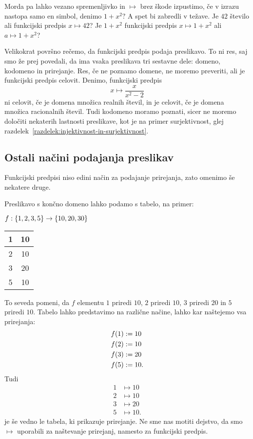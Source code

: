 Morda pa lahko vezano spremenljivko in $\mapsto$ brez škode izpustimo, če v izrazu nastopa
samo en simbol, denimo $1 + x^2?$
%
A spet bi zabredli v težave. Je $42$ število ali funkcijski predpis $x \mapsto 42$? Je
$1 + x^2$ funkcijski predpis $x \mapsto 1 + x^2$ ali $a \mapsto 1 + x^2$?

Velikokrat površno rečemo, da funkcijski predpis podaja preslikavo. To ni res, saj smo že
prej povedali, da ima vsaka preslikava tri sestavne dele: domeno, kodomeno in prirejanje.
Res, če ne poznamo domene, ne moremo preveriti, ali je funkcijski predpis celovit. Denimo,
funkcijski predpis
%
\begin{equation*}
  x \mapsto \frac{x}{x^2 - 2}
\end{equation*}
%
ni celovit, če je domena množica realnih števil, in je celovit, če je domena množica
racionalnih števil. Tudi kodomeno moramo poznati, sicer ne moremo določiti nekaterih
lastnosti preslikave, kot je na primer surjektivnost, glej
razdelek~\ref{razdelek:injektivnost-in-surjektivnost}.



\subsection{Ostali načini podajanja preslikav}
\label{sec:ostali-predpisi}

Funkcijski predpisi niso edini način za podajanje prirejanja, zato omenimo še nekatere
druge.

Preslikavo s končno domeno lahko podamo s tabelo, na primer:
%
\begin{center}
  $f : \left\{1, 2, 3, 5\right\} \to \left\{10, 20, 30\right\}$

  \medskip

  \begin{tabular}{|c|c|} \hline
    1 & 10 \\ \hline
    2 & 10 \\ \hline
    3 & 20 \\ \hline
    5 & 10 \\ \hline
  \end{tabular}
\end{center}
%
To seveda pomeni, da $f$ elementu $1$ priredi $10$, $2$ priredi $10$, $3$ priredi $20$ in $5$
priredi $10$. Tabelo lahko predstavimo na različne načine, lahko kar naštejemo vsa prirejanja:
%
\begin{align*}
  f(1) &\mathrel{{:}{=}} 10 \\
  f(2) &\mathrel{{:}{=}} 10 \\
  f(3) &\mathrel{{:}{=}} 20 \\
  f(5) &\mathrel{{:}{=}} 10.
\end{align*}
%
Tudi
%
\begin{align*}
  1 &\mapsto 10 \\
  2 &\mapsto 10 \\
  3 &\mapsto 20 \\
  5 &\mapsto 10.
\end{align*}
%
je še vedno le tabela, ki prikazuje prirejanje. Ne sme nas motiti dejstvo, da smo
$\mapsto$ uporabili za naštevanje prirejanj, namesto za funkcijski predpis.

